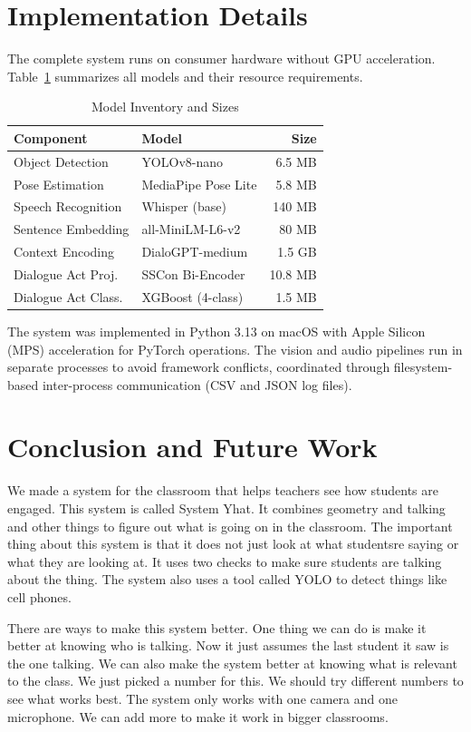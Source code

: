 \documentclass[conference]{IEEEtran}
\begin{document}
\section{Implementation Details}
The complete system runs on consumer hardware without GPU acceleration. Table~\ref{tab:models} summarizes all models and their resource requirements.
\begin{table}[htbp]
\caption{Model Inventory and Sizes}
\begin{center}
\begin{tabular}{|l|l|r|}
\hline
\textbf{Component} & \textbf{Model} & \textbf{Size} \\
\hline
Object Detection & YOLOv8-nano & 6.5 MB \\
Pose Estimation & MediaPipe Pose Lite & 5.8 MB \\
Speech Recognition & Whisper (base) & 140 MB \\
Sentence Embedding & all-MiniLM-L6-v2 & 80 MB \\
Context Encoding & DialoGPT-medium & 1.5 GB \\
Dialogue Act Proj. & SSCon Bi-Encoder & 10.8 MB \\
Dialogue Act Class. & XGBoost (4-class) & 1.5 MB \\
\hline
\end{tabular}
\label{tab:models}
\end{center}
\end{table}
The system was implemented in Python 3.13 on macOS with Apple Silicon (MPS) acceleration for PyTorch operations. The vision and audio pipelines run in separate processes to avoid framework conflicts, coordinated through filesystem-based inter-process communication (CSV and JSON log files).

\newpage
\section{Conclusion and Future Work}
We made a system for the classroom that helps teachers see how students are engaged. This system is called System Yhat. It combines geometry and talking and other things to figure out what is going on in the classroom. The important thing about this system is that it does not just look at what studentsre saying or what they are looking at. It uses two checks to make sure students are talking about the thing. The system also uses a tool called YOLO to detect things like cell phones.

There are ways to make this system better. One thing we can do is make it better at knowing who is talking. Now it just assumes the last student it saw is the one talking. We can also make the system better at knowing what is relevant to the class. We just picked a number for this. We should try different numbers to see what works best. The system only works with one camera and one microphone. We can add more to make it work in bigger classrooms.
\end{document}
